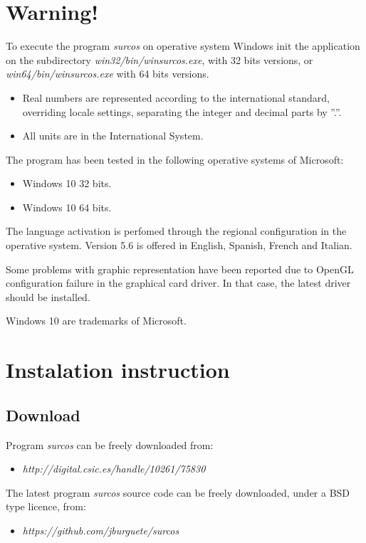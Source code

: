 \chapter*{Warning!}

To execute the program \emph{surcos} on operative system Windows init the
application on the subdirectory \emph{win32/bin/winsurcos.exe}, with 32 bits
versions, or \emph{win64/bin/winsurcos.exe} with 64 bits versions.

\begin{itemize}
\item Real numbers are represented according to the international standard,
overriding locale settings, separating the integer and decimal parts by ''.''.
\item All units are in the International System.
\end{itemize}

The program has been tested in the following operative systems of Microsoft:
\begin{itemize}
\item Windows 10 32 bits.
\item Windows 10 64 bits.
\end{itemize}

The language activation is perfomed through the regional configuration in the 
operative system. Version 5.6 is offered in English, Spanish, French and Italian. 

Some problems with graphic representation have been reported due to OpenGL 
configuration failure in the graphical card driver. In that case, the latest driver
should be installed.

Windows 10 are trademarks of Microsoft.

\setcounter{page}{1}

\chapter{Instalation instruction}

\section{Download}

Program \emph{surcos} can be freely downloaded from:
\begin{itemize}
\item \textit{http://digital.csic.es/handle/10261/75830}
\end{itemize}
The latest program \emph{surcos} source code can be freely downloaded, under
a BSD type licence, from:
\begin{itemize}
\item \textit{https://github.com/jburguete/surcos}
\end{itemize}

